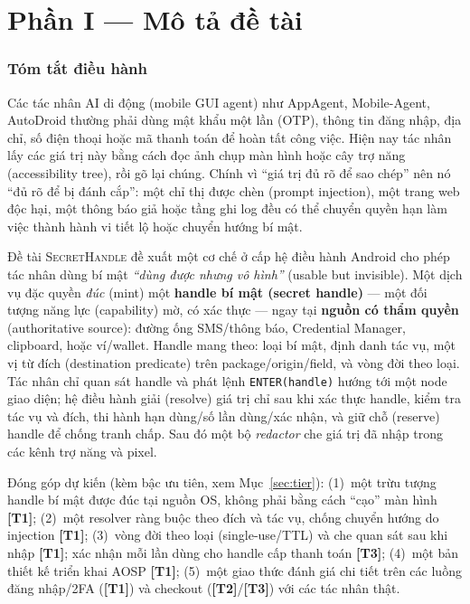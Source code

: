 \documentclass[11pt,a4paper]{article}
\newcommand{\code}[1]{\texttt{\small #1}}
\newcommand{\term}[1]{\textbf{#1}}
\newcommand{\SH}{\textsc{SecretHandle}}
\newcommand{\Tone}{\textbf{\color{shgreen}[T1]}}
\newcommand{\Ttwo}{\textbf{\color{shblue}[T2]}}
\newcommand{\Tthree}{\textbf{\color{shgray}[T3]}}
\begin{document}
\part*{Phần I --- Mô tả đề tài}

\section{Tóm tắt điều hành}

Các tác nhân AI di động (mobile GUI agent) như AppAgent, Mobile-Agent, AutoDroid thường phải dùng
mật khẩu một lần (OTP), thông tin đăng nhập, địa chỉ, số điện thoại hoặc mã thanh toán để hoàn tất công việc.
Hiện nay tác nhân lấy các giá trị này bằng cách đọc ảnh chụp màn hình hoặc cây trợ năng (accessibility tree),
rồi gõ lại chúng. Chính vì ``giá trị đủ rõ để sao chép'' nên nó ``đủ rõ để bị đánh cắp'': một chỉ thị được
chèn (prompt injection), một trang web độc hại, một thông báo giả hoặc tầng ghi log đều có thể chuyển quyền
hạn làm việc thành hành vi tiết lộ hoặc chuyển hướng bí mật.

Đề tài \SH{} đề xuất một cơ chế ở cấp hệ điều hành Android cho phép tác nhân dùng bí mật
\emph{``dùng được nhưng vô hình''} (usable but invisible). Một dịch vụ đặc quyền \emph{đúc} (mint) một
\term{handle bí mật (secret handle)} --- một đối tượng năng lực (capability) mờ, có xác thực --- ngay tại
\term{nguồn có thẩm quyền} (authoritative source): đường ống SMS/thông báo, Credential Manager, clipboard,
hoặc ví/wallet. Handle mang theo: loại bí mật, định danh tác vụ, một vị từ đích (destination predicate) trên
package/origin/field, và vòng đời theo loại. Tác nhân chỉ quan sát handle và phát lệnh \code{ENTER(handle)}
hướng tới một node giao diện; hệ điều hành giải (resolve) giá trị chỉ sau khi xác thực handle, kiểm tra tác vụ
và đích, thi hành hạn dùng/số lần dùng/xác nhận, và giữ chỗ (reserve) handle để chống tranh chấp. Sau đó một
bộ \emph{redactor} che giá trị đã nhập trong các kênh trợ năng và pixel.

Đóng góp dự kiến (kèm bậc ưu tiên, xem Mục~\ref{sec:tier}):
(1)~một trừu tượng handle bí mật được đúc tại nguồn OS, không phải bằng cách ``cạo'' màn hình \Tone;
(2)~một resolver ràng buộc theo đích và tác vụ, chống chuyển hướng do injection \Tone;
(3)~vòng đời theo loại (single-use/TTL) và che quan sát sau khi nhập \Tone; xác nhận mỗi lần dùng cho handle cấp thanh toán \Tthree;
(4)~một bản thiết kế triển khai AOSP \Tone;
(5)~một giao thức đánh giá chi tiết trên các luồng đăng nhập/2FA (\Tone) và checkout (\Ttwo/\Tthree) với các tác nhân thật.
\end{document}
